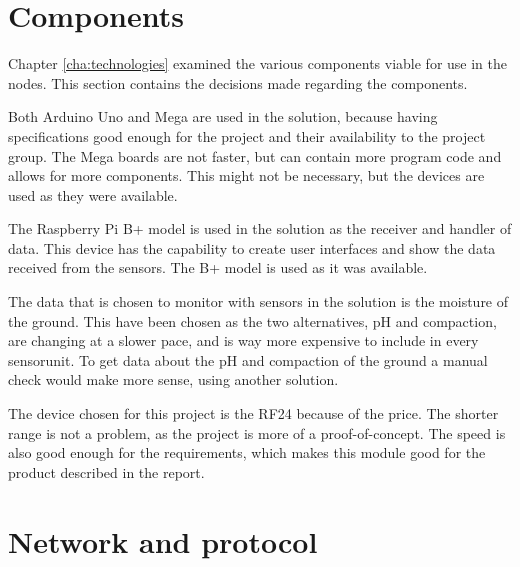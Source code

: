 \section{Components}
Chapter \ref{cha:technologies} examined the various components viable for use in the nodes. This section contains the decisions made regarding the components.

Both Arduino Uno and Mega are used in the solution, because having specifications good enough for the project and their availability to the project group. The Mega boards are not faster, but can contain more program code and allows for more components. This might not be necessary, but the devices are used as they were available.

The Raspberry Pi B+ model is used in the solution as the receiver and handler of data. This device has the capability to create user interfaces and show the data received from the sensors. The B+ model is used as it was available.

The data that is chosen to monitor with sensors in the solution is the moisture of the ground. This have been chosen as the two alternatives, pH and compaction, are changing at a slower pace, and is way more expensive to include in every sensorunit. To get data about the pH and compaction of the ground a manual check would make more sense, using another solution. 

The device chosen for this project is the RF24 because of the price. The shorter range is not a problem, as the project is more of a proof-of-concept. The speed is also good enough for the requirements, which makes this module good for the product described in the report.



\section{Network and protocol}

